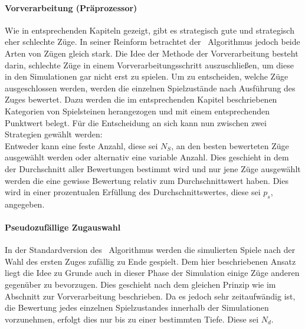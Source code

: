 \paragraph{Vorverarbeitung (Präprozessor)}
Wie in entsprechenden Kapiteln gezeigt, gibt es strategisch gute und strategisch eher schlechte Züge. In seiner Reinform betrachtet der \mc\ Algorithmus jedoch beide Arten von Zügen gleich stark. Die Idee der Methode der Vorverarbeitung besteht darin, schlechte Züge in einem Vorverarbeitungsschritt auszuschließen, um diese in den Simulationen gar nicht erst zu spielen. Um zu entscheiden, welche Züge ausgeschlossen werden, werden die einzelnen Spielzustände nach Ausführung des Zuges bewertet. Dazu werden die im entsprechenden Kapitel beschriebenen Kategorien von Spielsteinen herangezogen und mit einem entsprechenden Punktwert belegt. Für die Entscheidung an sich kann nun zwischen zwei Strategien gewählt werden:\\
Entweder kann eine feste Anzahl, diese sei $N_{S}$, an den besten bewerteten Züge ausgewählt werden oder alternativ eine variable Anzahl. Dies geschieht in dem der Durchschnitt aller Bewertungen bestimmt wird und nur jene Züge ausgewählt werden die eine gewisse Bewertung relativ zum Durchschnittswert haben. Dies wird in einer prozentualen Erfüllung des Durchschnittswertes, diese sei $p_{s}$, angegeben.
\paragraph{Pseudozufällige Zugauswahl}
\label{Pseudornd-move-selection}
In der Standardversion des \mc\ Algorithmus werden die simulierten Spiele nach der Wahl des ersten Zuges zufällig zu Ende gespielt. Dem hier beschriebenen Ansatz liegt die Idee zu Grunde auch in dieser Phase der Simulation einige Züge anderen gegenüber zu bevorzugen. Dies geschieht nach dem gleichen Prinzip wie im Abschnitt zur Vorverarbeitung beschrieben. Da es jedoch sehr zeitaufwändig ist, die Bewertung jedes einzelnen Spielzustandes innerhalb der Simulationen vorzunehmen, erfolgt dies nur bis zu einer bestimmten Tiefe. Diese sei $N_{d}$.